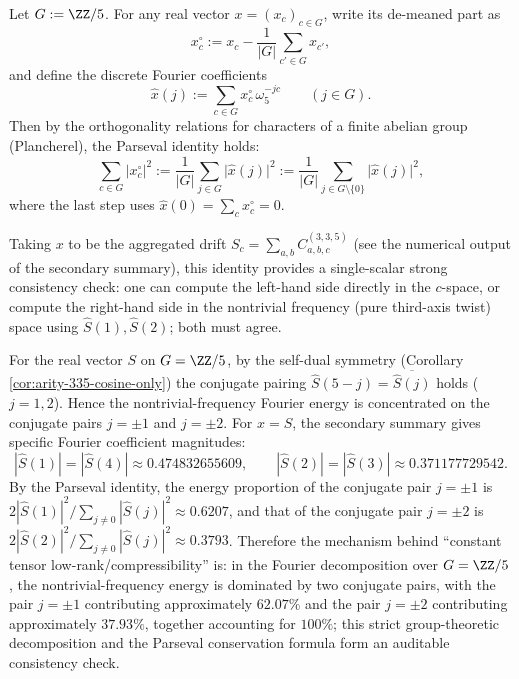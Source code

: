 \begin{remark}\label{rem:arity-335-parseval-bias}
Let \(G:=\ZZ/5\).
For any real vector \(x=(x_c)_{c\in G}\), write its de-meaned part as
\[
x_c^\circ:=x_c-\frac{1}{|G|}\sum_{c'\in G}x_{c'},
\]
and define the discrete Fourier coefficients
\[
\widehat x(j):=\sum_{c\in G}x_c^\circ\,\omega_5^{-jc}\qquad(j\in G).
\]
Then by the orthogonality relations for characters of a finite abelian group (Plancherel), the Parseval identity holds:
\[
\sum_{c\in G}\bigl|x_c^\circ\bigr|^2
:=\frac{1}{|G|}\sum_{j\in G}\bigl|\widehat x(j)\bigr|^2
:=\frac{1}{|G|}\sum_{j\in G\setminus\{0\}}\bigl|\widehat x(j)\bigr|^2,
\]
where the last step uses \(\widehat x(0)=\sum_c x_c^\circ=0\).
\par
Taking \(x\) to be the aggregated drift \(S_c=\sum_{a,b}C^{(3,3,5)}_{a,b,c}\) (see the numerical output of the secondary summary), this identity provides a single-scalar strong consistency check: one can compute the left-hand side directly in the \(c\)-space, or compute the right-hand side in the nontrivial frequency (pure third-axis twist) space using \(\widehat S(1),\widehat S(2)\); both must agree.
\par
For the real vector \(S\) on \(G=\ZZ/5\), by the self-dual symmetry (Corollary \ref{cor:arity-335-cosine-only}) the conjugate pairing \(\widehat S(5-j)=\overline{\widehat S(j)}\) holds (\(j=1,2\)). Hence the nontrivial-frequency Fourier energy is concentrated on the conjugate pairs \(j=\pm 1\) and \(j=\pm 2\). For \(x=S\), the secondary summary gives specific Fourier coefficient magnitudes:
\[
|\widehat S(1)|=|\widehat S(4)|\approx 0.474832655609,\qquad |\widehat S(2)|=|\widehat S(3)|\approx 0.371177729542.
\]
By the Parseval identity, the energy proportion of the conjugate pair \(j=\pm 1\) is \(2|\widehat S(1)|^2/\sum_{j\neq 0}|\widehat S(j)|^2\approx 0.6207\), and that of the conjugate pair \(j=\pm 2\) is \(2|\widehat S(2)|^2/\sum_{j\neq 0}|\widehat S(j)|^2\approx 0.3793\). Therefore the mechanism behind ``constant tensor low-rank/compressibility'' is: in the Fourier decomposition over \(G=\ZZ/5\), the nontrivial-frequency energy is dominated by two conjugate pairs, with the pair \(j=\pm 1\) contributing approximately \(62.07\%\) and the pair \(j=\pm 2\) contributing approximately \(37.93\%\), together accounting for \(100\%\); this strict group-theoretic decomposition and the Parseval conservation formula form an auditable consistency check.
\end{remark}

